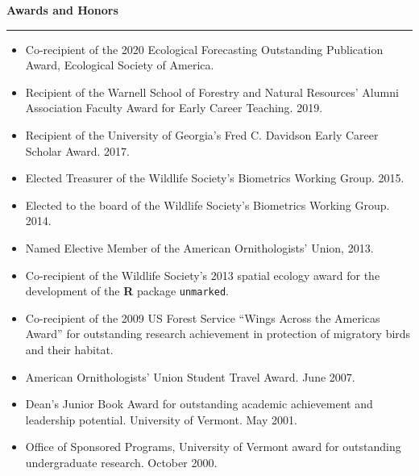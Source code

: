 \vspace{0.5cm}



{\large \bf Awards and Honors} \\
\rule[3mm]{\textwidth}{0.3mm}

\begin{itemize}

\item Co-recipient of the 2020 Ecological Forecasting Outstanding
  Publication Award, Ecological Society of America. 
  
\item Recipient of the Warnell School of Forestry and Natural
  Resources' Alumni Association Faculty Award for Early Career
  Teaching. 2019. 
  
\item Recipient of the University of Georgia's Fred C. Davidson Early
  Career Scholar Award. 2017. 

\item Elected Treasurer of the Wildlife Society's Biometrics Working
  Group. 2015. 

\item Elected to the board of the Wildlife Society's Biometrics
  Working Group. 2014. 

\item Named Elective Member of the American Ornithologists' Union,
  2013. 

\item Co-recipient of the Wildlife Society's 2013 spatial ecology award for
  the development of the {\bf R} package {\tt unmarked}.

\item Co-recipient of the 2009 US Forest Service ``Wings Across the Americas Award''
for outstanding research achievement in protection of
migratory birds and their habitat.

\item American Ornithologists' Union Student Travel Award. June 2007.

\item Dean's Junior Book Award for outstanding academic achievement
  and leadership potential. University of Vermont. May 2001.

\item Office of Sponsored Programs, University of Vermont award for
  outstanding undergraduate research. October 2000.

\end{itemize}


